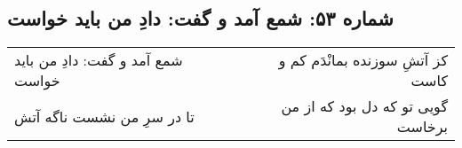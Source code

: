 \begin{center}
\section*{شماره ۵۳: شمع آمد و گفت: دادِ من باید خواست}
\label{sec:053}
\begin{longtable}{l p{0.5cm} r}
شمع آمد و گفت: دادِ من باید خواست
&&
کز آتشِ سوزنده بمانْدَم کم و کاست
\\
تا در سرِ من نشست ناگه آتش
&&
گویی تو که دل بود که از من برخاست
\\
\end{longtable}
\end{center}
